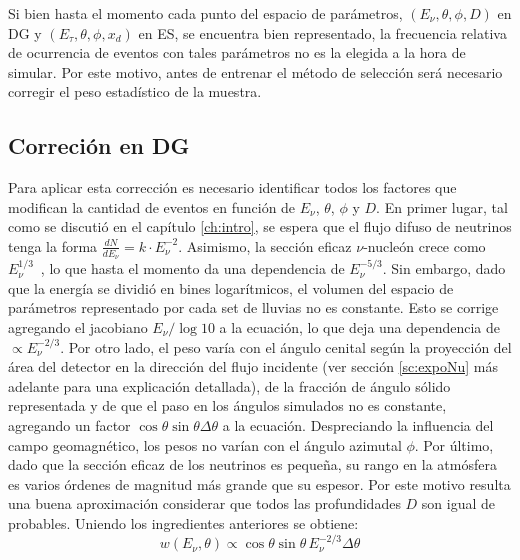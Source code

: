 	Si bien hasta el momento cada punto del espacio de parámetros, $(E_\nu,\theta,\phi,D)$ en DG y $(E_\tau,\theta,\phi,x_d)$ en ES, se encuentra bien representado, la frecuencia relativa de ocurrencia de eventos con tales par\'ametros no es la elegida a la hora de simular.
	Por este motivo, antes de entrenar el método de selección será necesario corregir el peso estad\'istico de la muestra.
		
		\subsection{Correción en DG}
		
		Para aplicar esta correcci\'on es necesario identificar todos los factores que modifican la cantidad de eventos en funci\'on de $E_\nu$, $\theta$, $\phi$ y $D$.
		En primer lugar, tal como se discuti\'o en el cap\'itulo \ref{ch:intro}, se espera que el flujo difuso de neutrinos tenga la forma $\frac{dN}{dE_\nu}=k\cdot E_\nu^{-2}$. 
		Asimismo, la sección eficaz $\nu$-nucleón crece como $E_\nu^{1/3}$~\cite{cite:cooper_sarkar}, lo que hasta el momento da una dependencia de $E_\nu^{-5/3}$.
		Sin embargo, dado que la energ\'ia se dividi\'o en bines logar\'itmicos, el volumen del espacio de par\'ametros representado por cada set de lluvias no es constante.
		Esto se corrige agregando el jacobiano $E_\nu/\log{10}$ a la ecuaci\'on, lo que deja una dependencia de $\propto E_\nu^{-2/3}$.
		Por otro lado, el peso var\'ia con el ángulo cenital seg\'un la proyección del área del detector en la dirección del flujo incidente (ver sección \ref{sc:expoNu} más adelante para una explicación detallada), de la fracci\'on de \'angulo s\'olido representada y de que el paso en los ángulos simulados no es constante, agregando un factor $\cos\theta \sin\theta\Delta\theta$ a la ecuaci\'on.
		Despreciando la influencia del campo geomagn\'etico, los pesos no var\'ian con el \'angulo azimutal $\phi$.
		Por último, dado que la sección eficaz de los neutrinos es pequeña, su rango en la atmósfera es varios \'ordenes de magnitud m\'as grande que su espesor.
		Por este motivo resulta una buena aproximación considerar que todos las profundidades $D$ son igual de probables.
		Uniendo los ingredientes anteriores se obtiene:
		\begin{equation}
		w(E_\nu,\theta) \propto \cos\theta \sin\theta \, E_\nu^{-2/3} \Delta\theta
		\end{equation}
		
